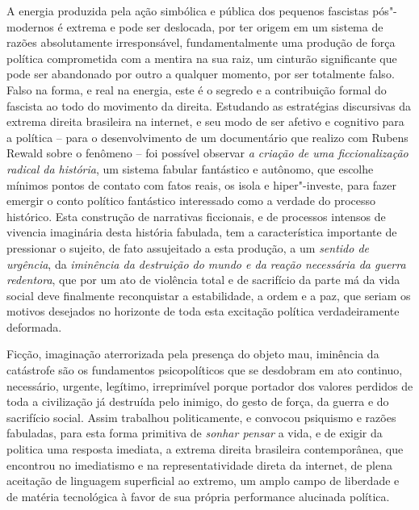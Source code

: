 A energia produzida pela ação simbólica e pública dos pequenos fascistas
pós"-modernos é extrema e pode ser deslocada, por ter origem em um
sistema de razões absolutamente irresponsável, fundamentalmente uma
produção de força política comprometida com a mentira na sua raiz, um
cinturão significante que pode ser abandonado por outro a qualquer
momento, por ser totalmente falso. Falso na forma, e real na energia,
este é o segredo e a contribuição formal do fascista ao todo do
movimento da direita. Estudando as estratégias discursivas da extrema
direita brasileira na internet, e seu modo de ser afetivo e cognitivo
para a política -- para o desenvolvimento de um documentário que realizo
com Rubens Rewald sobre o fenômeno -- foi possível observar \emph{a
criação de uma ficcionalização radical da história}, um sistema fabular
fantástico e autônomo, que escolhe mínimos pontos de contato com fatos
reais, os isola e hiper"-investe, para fazer emergir o conto político
fantástico interessado como a verdade do processo histórico. Esta
construção de narrativas ficcionais, e de processos intensos de vivencia
imaginária desta história fabulada, tem a característica importante de
pressionar o sujeito, de fato assujeitado a esta produção, a um
\emph{sentido de urgência}, da \emph{iminência da destruição do mundo e
da reação necessária da guerra redentora}, que por um ato de violência
total e de sacrifício da parte má da vida social deve finalmente
reconquistar a estabilidade, a ordem e a paz, que seriam os motivos
desejados no horizonte de toda esta excitação política verdadeiramente
deformada.

Ficção, imaginação aterrorizada pela presença do objeto mau, iminência
da catástrofe são os fundamentos psicopolíticos que se desdobram em ato
continuo, necessário, urgente, legítimo, irreprimível porque portador
dos valores perdidos de toda a civilização já destruída pelo inimigo, do
gesto de força, da guerra e do sacrifício social. Assim trabalhou
politicamente, e convocou psiquismo e razões fabuladas, para esta forma
primitiva de \emph{sonhar pensar} a vida, e de exigir da politica uma
resposta imediata, a extrema direita brasileira contemporânea, que
encontrou no imediatismo e na representatividade direta da internet, de
plena aceitação de linguagem superficial ao extremo, um amplo campo de
liberdade e de matéria tecnológica à favor de sua própria performance
alucinada política.

